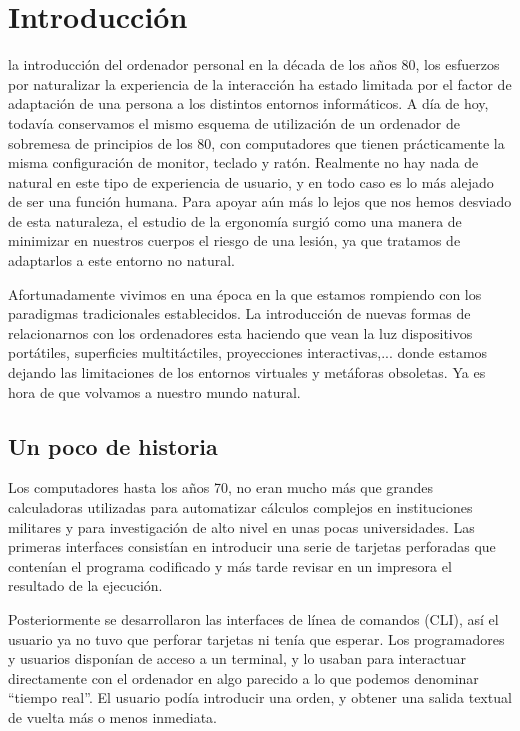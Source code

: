 \chapter{Introducción}
 la introducción del ordenador personal en la década de los años 80, los esfuerzos por naturalizar la experiencia de la interacción ha estado limitada por el factor de adaptación de una persona a los distintos entornos informáticos. A día de hoy, todavía conservamos el mismo esquema de utilización de un ordenador de sobremesa de principios de los 80, con computadores que tienen prácticamente la misma configuración de monitor, teclado y ratón. Realmente no hay nada de natural en este tipo de experiencia de usuario, y en todo caso es lo más alejado de ser una función humana. Para apoyar aún más lo lejos que nos hemos desviado de esta naturaleza, el estudio de la ergonomía surgió como una manera de minimizar en nuestros cuerpos el riesgo de una lesión, ya que tratamos de adaptarlos a este entorno no natural.

Afortunadamente vivimos en una época en la que estamos rompiendo con los paradigmas tradicionales establecidos. La introducción de nuevas formas de relacionarnos con los ordenadores esta haciendo que vean la luz dispositivos portátiles, superficies multitáctiles, proyecciones interactivas,... donde estamos dejando las limitaciones de los entornos virtuales y metáforas obsoletas. Ya es hora de que volvamos a nuestro mundo natural.

\section{Un poco de historia}
Los computadores hasta los años 70, no eran mucho más que grandes calculadoras utilizadas para automatizar cálculos complejos en instituciones militares y para investigación de alto nivel en unas pocas universidades. Las primeras interfaces consistían en introducir una serie de tarjetas perforadas que contenían el programa codificado y más tarde revisar en un impresora el resultado de la ejecución.

Posteriormente se desarrollaron las interfaces de línea de comandos (CLI), así el usuario ya no tuvo que perforar tarjetas ni tenía que esperar. Los programadores y usuarios disponían de acceso a un terminal, y lo usaban para interactuar directamente con el ordenador en algo parecido a lo que podemos denominar ``tiempo real''. El usuario podía introducir una orden, y obtener una salida textual de vuelta más o menos inmediata.

